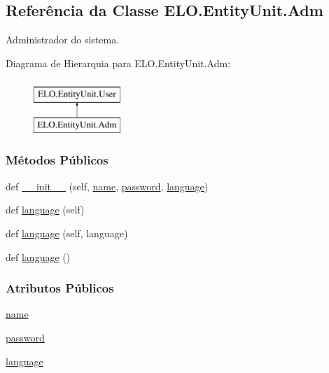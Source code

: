 \hypertarget{classELO_1_1EntityUnit_1_1Adm}{}\subsection{Referência da Classe E\+L\+O.\+Entity\+Unit.\+Adm}
\label{classELO_1_1EntityUnit_1_1Adm}


Administrador do sistema.  


Diagrama de Hierarquia para E\+L\+O.\+Entity\+Unit.\+Adm\+:\begin{figure}[H]
\begin{center}
\leavevmode
\includegraphics[height=2.000000cm]{d3/d3a/classELO_1_1EntityUnit_1_1Adm}
\end{center}
\end{figure}
\subsubsection*{Métodos Públicos}
\begin{DoxyCompactItemize}
\item 
def \hyperlink{classELO_1_1EntityUnit_1_1Adm_a22ff0cf751229aa1f93457351ab49da9}{\+\_\+\+\_\+init\+\_\+\+\_\+} (self, \hyperlink{classELO_1_1EntityUnit_1_1Adm_a12f7aaf17dc6e036186e7757244cd12a}{name}, \hyperlink{classELO_1_1EntityUnit_1_1Adm_aed97c3f4efa1320ef99b3794b51f8e5e}{password}, \hyperlink{classELO_1_1EntityUnit_1_1Adm_a2d4b3c7bd74c828fa965f4d840ff7124}{language})
\item 
def \hyperlink{classELO_1_1EntityUnit_1_1Adm_a96f3c44b12b9ca48520e69dd42d63f29}{language} (self)
\item 
def \hyperlink{classELO_1_1EntityUnit_1_1Adm_a59a629a85d8abb6f8037324e5db46a1c}{language} (self, language)
\item 
def \hyperlink{classELO_1_1EntityUnit_1_1Adm_a9e433d025ec98e741a51a80bb645c09b}{language} ()
\end{DoxyCompactItemize}
\subsubsection*{Atributos Públicos}
\begin{DoxyCompactItemize}
\item 
\hyperlink{classELO_1_1EntityUnit_1_1Adm_a12f7aaf17dc6e036186e7757244cd12a}{name}
\item 
\hyperlink{classELO_1_1EntityUnit_1_1Adm_aed97c3f4efa1320ef99b3794b51f8e5e}{password}
\item 
\hyperlink{classELO_1_1EntityUnit_1_1Adm_a2d4b3c7bd74c828fa965f4d840ff7124}{language}
\end{DoxyCompactItemize}


